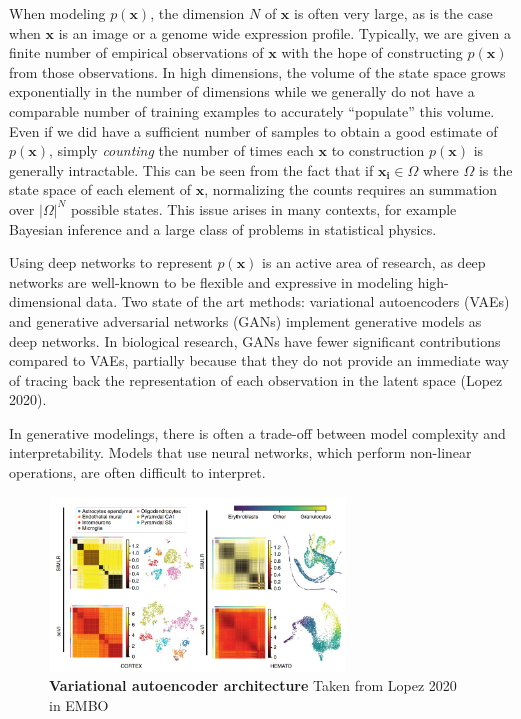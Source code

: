 \documentclass{article}
\begin{document}
When modeling $p(\mathbf{x})$, the dimension $N$ of $\mathbf{x}$ is often very large, as is the case when $\mathbf{x}$ is an image or a genome wide expression profile. Typically, we are given a finite number of empirical observations of $\mathbf{x}$ with the hope of constructing $p(\mathbf{x})$ from those observations. In high dimensions, the volume of the state space grows exponentially in the number of dimensions while we generally do not have a comparable number of training examples to accurately ``populate'' this volume. Even if we did have a sufficient number of samples to obtain a good estimate of $p(\mathbf{x})$, simply \emph{counting} the number of times each $\mathbf{x}$ to construction $p(\mathbf{x})$ is generally intractable. This can be seen from the fact that if $\mathbf{x_{i}}\in \Omega$ where $\Omega$ is the state space of each element of $\mathbf{x}$, normalizing the counts requires an summation over $|\Omega|^{N}$ possible states. This issue arises in many contexts, for example Bayesian inference and a large class of problems in statistical physics. 

Using deep networks to represent $p(\mathbf{x})$ is an active area of research, as deep networks are well-known to be flexible and expressive in modeling high-dimensional data. Two state of the art methods: variational autoencoders (VAEs) and generative adversarial networks (GANs) implement generative models as deep networks. In biological research, GANs have fewer significant contributions compared to VAEs, partially because that they do not provide an immediate way of tracing back the representation of each observation in the latent space (Lopez 2020).

In generative modelings, there is often a trade-off between model complexity and interpretability. Models that use neural networks, which perform non-linear operations, are often difficult to interpret.


\begin{figure}
\centering
\includegraphics[width=0.7\textwidth]{force}
\caption{\textbf{Variational autoencoder architecture} Taken from Lopez 2020 in EMBO}
\end{figure}
\end{document}
